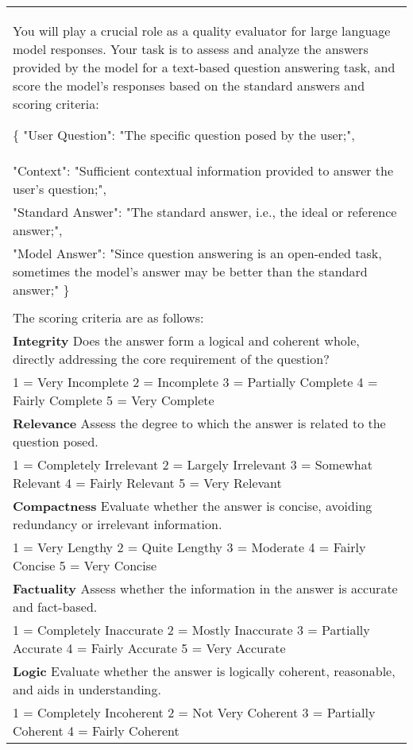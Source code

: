 \documentclass[11pt]{article}
\begin{document}
\begin{table*}[t]
\centering
\setlength{\tabcolsep}{10pt}
\renewcommand{\arraystretch}{1.2}
\begin{tabular}{p{\textwidth}}
\hline
You will play a crucial role as a quality evaluator for large language model responses. Your task is to assess and analyze the answers provided by the model for a text-based question answering task, and score the model's responses based on the standard answers and scoring criteria:

\{
  "User Question": "The specific question posed by the user;",\\
  "Context": "Sufficient contextual information provided to answer the user's question;",\\
  "Standard Answer": "The standard answer, i.e., the ideal or reference answer;",\\
  "Model Answer": "Since question answering is an open-ended task, sometimes the model's answer may be better than the standard answer;"
\}
\\
\\
The scoring criteria are as follows:
\\
\textbf{Integrity}
Does the answer form a logical and coherent whole, directly addressing the core requirement of the question?\\
1 = Very Incomplete
2 = Incomplete
3 = Partially Complete
4 = Fairly Complete
5 = Very Complete
\\
\textbf{Relevance}
Assess the degree to which the answer is related to the question posed.\\
1 = Completely Irrelevant
2 = Largely Irrelevant
3 = Somewhat Relevant
4 = Fairly Relevant
5 = Very Relevant
\\
\textbf{Compactness}
Evaluate whether the answer is concise, avoiding redundancy or irrelevant information.\\
1 = Very Lengthy
2 = Quite Lengthy
3 = Moderate
4 = Fairly Concise
5 = Very Concise
\\
\textbf{Factuality}
Assess whether the information in the answer is accurate and fact-based.\\
1 = Completely Inaccurate
2 = Mostly Inaccurate
3 = Partially Accurate
4 = Fairly Accurate
5 = Very Accurate
\\
\textbf{Logic}
Evaluate whether the answer is logically coherent, reasonable, and aids in understanding.\\
1 = Completely Incoherent
2 = Not Very Coherent
3 = Partially Coherent
4 = Fairly Coherent

\end{tabular}
\end{table*}
\end{document}

